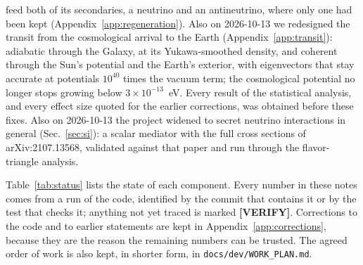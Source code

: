\documentclass[11pt,a4paper]{article}
\newcommand{\note}[1]{\textbf{[#1]}}
\newcommand{\file}[1]{\nolinkurl{#1}}
\begin{document}
\begin{center}
{\begin{minipage}{0.94\textwidth}
feed both of its secondaries, a neutrino and an antineutrino, where only one had been kept
(Appendix~\ref{app:regeneration}). Also on 2026-10-13 we redesigned the transit from the
cosmological arrival to the Earth (Appendix~\ref{app:transit}): adiabatic through the Galaxy, at
its Yukawa-smoothed density, and coherent through the Sun's potential and the Earth's exterior,
with eigenvectors that stay accurate at potentials $10^{40}$ times the vacuum term; the
cosmological potential no longer stops growing below $3\times10^{-13}$~eV. Every result of the
statistical analysis, and every effect size quoted for the earlier corrections, was obtained
before these fixes. Also on 2026-10-13 the project widened to secret neutrino interactions in
general (Sec.~\ref{sec:si}): a scalar mediator with the full cross sections of arXiv:2107.13568,
validated against that paper and run through the flavor-triangle analysis.
\end{minipage}}
\end{center}

Table~\ref{tab:status} lists the state of each component. Every number in these notes comes
from a run of the code, identified by the commit that contains it or by the test that checks
it; anything not yet traced is marked \note{VERIFY}. Corrections to the code and to earlier
statements are kept in Appendix~\ref{app:corrections}, because they are the reason the
remaining numbers can be trusted. The agreed order of work is also kept, in shorter form, in
\file{docs/dev/WORK_PLAN.md}.
\end{document}
